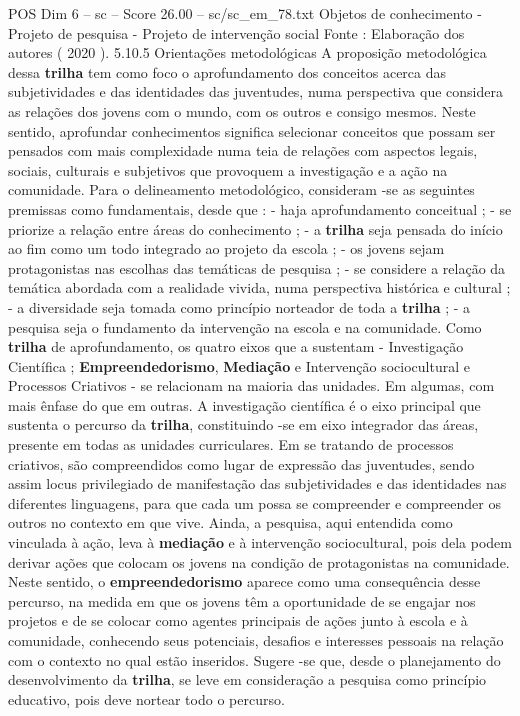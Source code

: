 \begin{textsample}{POS Dim 6 – sc – Score 26.00 – sc/sc\_em\_78.txt}
Objetos de conhecimento - Projeto de pesquisa - Projeto de intervenção social Fonte : Elaboração dos autores ( 2020 ). 5.10.5 Orientações metodológicas A proposição metodológica dessa \textbf{trilha} tem como foco o aprofundamento dos conceitos acerca das subjetividades e das identidades das juventudes, numa perspectiva que considera as relações dos jovens com o mundo, com os outros e consigo mesmos.
Neste sentido, aprofundar conhecimentos significa selecionar conceitos que possam ser pensados com mais complexidade numa teia de relações com aspectos legais, sociais, culturais e subjetivos que provoquem a investigação e a ação na comunidade.
Para o delineamento metodológico, consideram -se as seguintes premissas como fundamentais, desde que : - haja aprofundamento conceitual ; - se priorize a relação entre áreas do conhecimento ; - a \textbf{trilha} seja pensada do início ao fim como um todo integrado ao projeto da escola ; - os jovens sejam protagonistas nas escolhas das temáticas de pesquisa ; - se considere a relação da temática abordada com a realidade vivida, numa perspectiva histórica e cultural ; - a diversidade seja tomada como princípio norteador de toda a \textbf{trilha} ; - a pesquisa seja o fundamento da intervenção na escola e na comunidade.
Como \textbf{trilha} de aprofundamento, os quatro eixos que a sustentam - Investigação Científica ; \textbf{Empreendedorismo}, \textbf{Mediação} e Intervenção sociocultural e Processos Criativos - se relacionam na maioria das unidades.
Em algumas, com mais ênfase do que em outras.
A investigação científica é o eixo principal que sustenta o percurso da \textbf{trilha}, constituindo -se em eixo integrador das áreas, presente em todas as unidades curriculares.
Em se tratando de processos criativos, são compreendidos como lugar de expressão das juventudes, sendo assim locus privilegiado de manifestação das subjetividades e das identidades nas diferentes linguagens, para que cada um possa se compreender e compreender os outros no contexto em que vive.
Ainda, a pesquisa, aqui entendida como vinculada à ação, leva à \textbf{mediação} e à intervenção sociocultural, pois dela podem derivar ações que colocam os jovens na condição de protagonistas na comunidade.
Neste sentido, o \textbf{empreendedorismo} aparece como uma consequência desse percurso, na medida em que os jovens têm a oportunidade de se engajar nos projetos e de se colocar como agentes principais de ações junto à escola e à comunidade, conhecendo seus potenciais, desafios e interesses pessoais na relação com o contexto no qual estão inseridos.
Sugere -se que, desde o planejamento do desenvolvimento da \textbf{trilha}, se leve em consideração a pesquisa como princípio educativo, pois deve nortear todo o percurso.

\end{textsample}
